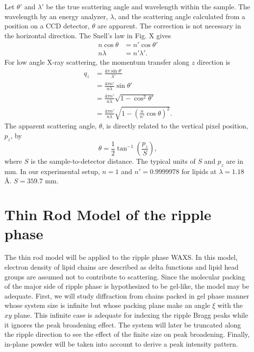 Let $\theta'$ and $\lambda'$ be the true scattering angle and wavelength
within the sample. The wavelength by an energy analyzer, $\lambda$, and the 
scattering angle calculated from a position on a CCD detector, $\theta$ are 
apparent. The correction is not necessary in the horizontal direction.
The Snell's law in Fig. X gives
\begin{align}
  n\cos\theta &= n'\cos\theta' \\
  n\lambda &= n'\lambda'.
\end{align}
For low angle X-ray scattering, the momentum transfer along $z$ direction is
\begin{align}
  q_z &= \frac{4\pi\sin\theta'}{\lambda'} \\
      &= \frac{4\pi n'}{n\lambda}\sin\theta' \\
      &= \frac{4\pi n'}{n\lambda}\sqrt{1-\cos^2\theta'} \\
      &= \frac{4\pi n'}{n\lambda}\sqrt{1-\left(\frac{n}{n'}\cos\theta\right)^2}.
\end{align}
The apparent scattering angle, $\theta$, is directly related to the vertical
pixel position, $p_z$, by 
\begin{equation}
  \theta = \frac{1}{2}\tan^{-1}\left(\frac{p_z}{S}\right),
\end{equation}
where $S$ is the sample-to-detector distance. The typical units of $S$ and 
$p_z$ are in mm. In our experimental setup,
$n=1$ and $n'=0.9999978$ for lipids at $\lambda=1.18$ \AA. 
$S=359.7$ mm.

\newpage
\section{Thin Rod Model of the ripple phase}
The thin rod model will be applied to the ripple phase WAXS. 
In this model, electron density of lipid chains are described as delta 
functions and lipid head groups are assumed not to contribute to scattering. 
Since the molecular packing of the major side of ripple phase is hypothesized 
to be gel-like, the model may be adequate. First, we will study diffraction 
from chains packed in gel phase manner whose system size is infinite but whose 
packing plane make an angle $\xi$ with the $xy$ plane. 
This infinite case is adequate for indexing the ripple Bragg peaks while
it ignores the peak broadening effect.
The system will later be truncated along the ripple direction to see the effect 
of the finite size on peak broadening. Finally, in-plane powder will be taken 
into account to derive a peak intensity pattern.

